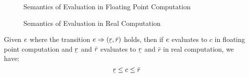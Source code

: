 \documentclass[a4paper,11pt]{article}
\begin{document}
\begin{figure}
\caption{Semantics of Evaluation in Floating Point Computation}
\label{fig_fl_semantics_exp}
\end{figure}

\begin{figure}
\caption{Semantics of Evaluation in Real Computation}
\label{fig_func_real_semantics_exp}
\end{figure}


\begin{thm}
Given $e$ where the transition 
$\expr \trsto (\ubar{\rval}, \bar{\rval})$ holds, 
then if $e$ evaluates to $c$ in floating point computation and 
$\ubar{\rval}$ and $\bar{r}$ evaluates to $\ubar{r}$ and $\bar{r}$ in real computation, we have: 
\[
\ubar{r} \leq c \leq \bar{r}
\]
\end{thm}


\newpage


\end{document}
